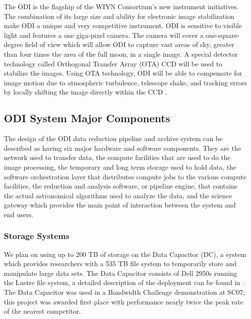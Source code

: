 \documentclass[10pt,conference]{IEEEtran}
\begin{document}
The ODI is the flagship of the WIYN Consortium's new instrument initiatives. The combination of its large size and ability for electronic image stabilization make ODI a unique and very competitive instrument. ODI is sensitive to visible light and features a one giga-pixel camera. The camera will cover a one-square-degree field of view which will allow ODI to capture vast areas of sky, greater than four times the area of the full moon, in a single image. A special detector technology called Orthogonal Transfer Array (OTA) CCD will be used to stabilize the images. Using OTA technology, ODI will be able to compensate for image motion due to atmospheric turbulence, telescope shake, and tracking errors by locally shifting the image directly within the CCD \cite{ODI}.  

\subsection{ODI System Major Components}\label{sec:components}

The design of the ODI data reduction pipeline and archive system can be described as having six major hardware and software components. They are the network used to transfer data, the compute facilities that are used to do the image processing, the temporary and long term storage used to hold data, the software orchestration layer that distributes compute jobs to the various compute facilities, the reduction and analysis software, or pipeline engine, that contains the actual astronomical algorithms used to analyze the data, and the science gateway which provides the main point of interaction between the system and end users. 

\subsubsection{Storage Systems}

We plan on using up to 200 TB of storage on the Data Capacitor (DC), a system which provides researchers with a 535 TB file system to temporarily store and manipulate large data sets. The Data Capacitor consists of Dell 2950s running the Lustre file system, a detailed description of the deployment can be found in \cite{simms2007}. The Data Capacitor was used in a Bandwidth Challenge demonstration at SC07; this project was awarded first place with performance nearly twice the peak rate of the nearest competitor.
\end{document}
